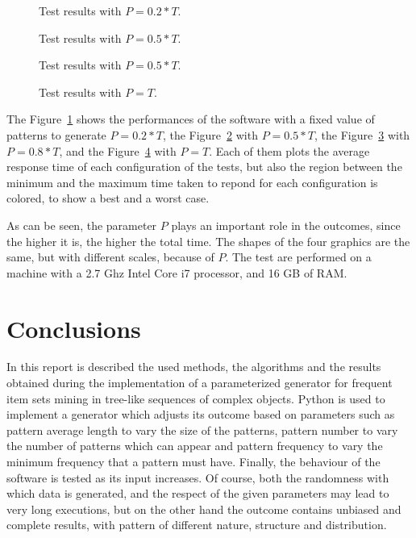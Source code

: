 \documentclass{acm_proc_article-sp-sigmod09}
\begin{document}
\begin{figure}
\centering
{}
\caption{Test results with $P = 0.2 * T$.}
\label{fig:zerotwo}
\end{figure}

\begin{figure}
\centering
{}
\caption{Test results with $P = 0.5 * T$.}
\label{fig:zerofive}
\end{figure}

\begin{figure}
\centering
{}
\caption{Test results with $P = 0.5 * T$.}
\label{fig:zeroeight}
\end{figure}

\begin{figure}
\centering
{}
\caption{Test results with $P = T$.}
\label{fig:one}
\end{figure}

The Figure~\ref{fig:zerotwo} shows the performances of the software with a fixed value of patterns to generate $P = 0.2 * T$, the Figure~\ref{fig:zerofive} with $P = 0.5 * T$, the Figure~\ref{fig:zeroeight} with $P = 0.8 * T$, and the Figure~\ref{fig:one} with $P = T$. Each of them plots the average response time of each configuration of the tests, but also the region between the minimum and the maximum time taken to repond for each configuration is colored, to show a best and a worst case.

As can be seen, the parameter $P$ plays an important role in the outcomes, since the higher it is, the higher the total time. The shapes of the four graphics are the same, but with different scales, because of $P$. The test are performed on a machine with a 2.7 Ghz Intel Core i7 processor, and 16 GB of RAM.

\section{Conclusions}
In this report is described the used methods, the algorithms and the results obtained during the implementation of a parameterized generator for frequent item sets mining in tree-like sequences of complex objects. Python is used to implement a generator which adjusts its outcome based on parameters such as pattern average length to vary the size of the patterns, pattern number to vary the number of patterns which can appear and pattern frequency to vary the minimum frequency that a pattern must have. Finally, the behaviour of the software is tested as its input increases. Of course, both the randomness with which data is generated, and the respect of the given parameters may lead to very long executions, but on the other hand the outcome contains unbiased and complete results, with pattern of different nature, structure and distribution.
\end{document}
